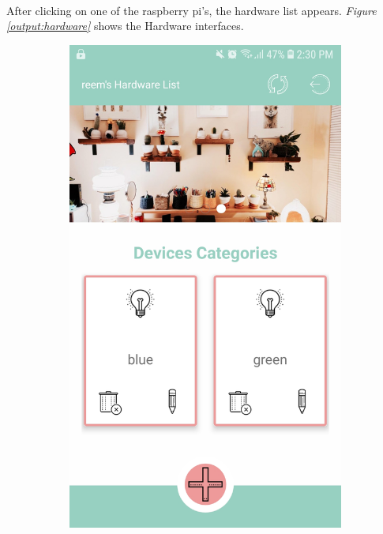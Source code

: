 \documentclass[12pt]{paper}
\begin{document}
		\paragraph{} After clicking on one of the raspberry pi's, the hardware list appears. \textit{Figure \ref{output:hardware}} shows the Hardware interfaces. 
		\begin{figure}[H]
			\centering
			\begin{subfigure}[b]{.35\linewidth}
				\includegraphics[width=\linewidth]{img/output_hardware_list.jpg}

\end{subfigure}
\end{figure}
\end{document}
